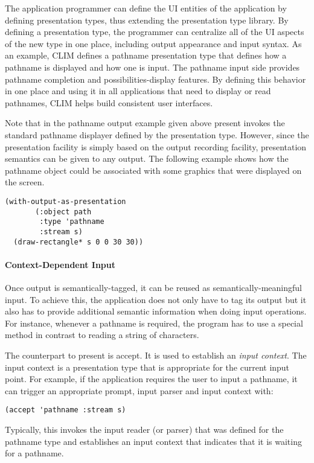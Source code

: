 \documentclass[twocolumn,a4paper]{article}
\newcommand {\concept} [1] {{\sl #1}\index{#1}}
\newcommand {\code}[1]{{\sffamily #1}}
\newcommand {\CLIM}{{\small CLIM}}
\let\method\code
\begin{document}
The application programmer can define the UI entities of the
application by defining presentation types, thus extending the
presentation type library. By defining a presentation type, the
programmer can centralize all of the UI aspects of the new type in one
place, including output appearance and input syntax. As an example,
\CLIM{} defines a pathname presentation type that defines how a
pathname is displayed and how one is input. The pathname input side
provides pathname completion and possibilities-display features. By
defining this behavior in one place and using it in all applications
that need to display or read pathnames, \CLIM{} helps build consistent
user interfaces.

Note that in the pathname output example given above \method{present}
invokes the standard pathname displayer defined by the presentation
type. However, since the presentation facility is simply based on the
output recording facility, presentation semantics can be given to any
output. The following example shows how the pathname object could be
associated with some graphics that were displayed on the screen.

\begin{lstlisting}
(with-output-as-presentation 
       (:object path
        :type 'pathname 
        :stream s) 
  (draw-rectangle* s 0 0 30 30))
\end{lstlisting}

\paragraph*{Context-Dependent Input} Once output is
semantically-tagged, it can be reused as semantically-meaningful
input. To achieve this, the application does not only have to tag its
output but it also has to provide additional semantic information when
doing input operations. For instance, whenever a pathname is required,
the program has to use a special method in contrast to reading a
string of characters.

The counterpart to \method{present} is \method{accept}. It is used to
establish an \concept{input context}.  The input context is a
presentation type that is appropriate for the current input point. For
example, if the application requires the user to input a pathname, it
can trigger an appropriate prompt, input parser and input context
with:
\begin{lstlisting}
(accept 'pathname :stream s)
\end{lstlisting}
Typically, this invokes the input reader (or parser) that was defined
for the pathname type and establishes an input context that indicates
that it is waiting for a pathname.
\end{document}
